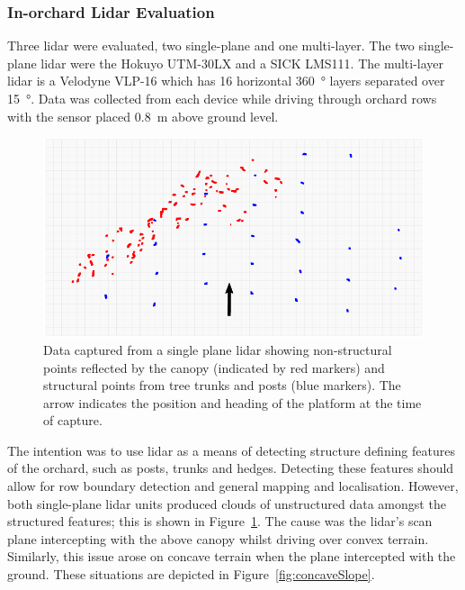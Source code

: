 \documentclass[preprint,authoryear,12pt]{elsarticle}
\begin{document}
    \subsubsection{In-orchard Lidar Evaluation}
        Three lidar were evaluated, two single-plane and one multi-layer.
        The two single-plane lidar were the Hokuyo UTM-30LX and a SICK LMS111.
        The multi-layer lidar is a Velodyne VLP-16 which has 16 horizontal \SI{360}{\degree} layers separated over \SI{15}{\degree}.
        Data was collected from each device while driving through orchard rows with the sensor placed \SI{0.8}{\meter} above ground level.

        \begin{figure}[htb]
            \centering
            \includegraphics[width=\linewidth]{imgs/canopy_data/canopy_data.pdf}
            \caption{
                Data captured from a single plane lidar showing non-structural points reflected by the canopy (indicated by red markers) and structural points from tree trunks and posts (blue markers).
                The arrow indicates the position and heading of the platform at the time of capture.
            }
            \label{fig:canopyDataCloud}
        \end{figure}

        The intention was to use lidar as a means of detecting structure defining features of the orchard, such as posts, trunks and hedges.
        Detecting these features should allow for row boundary detection and general mapping and localisation.
        However, both single-plane lidar units produced clouds of unstructured data amongst the structured features; this is shown in Figure~\ref{fig:canopyDataCloud}.
        The cause was the lidar's scan plane intercepting with the above canopy whilst driving over convex terrain.
        Similarly, this issue arose on concave terrain when the plane intercepted with the ground.
        These situations are depicted in Figure~\ref{fig:concaveSlope}.
\end{document}
